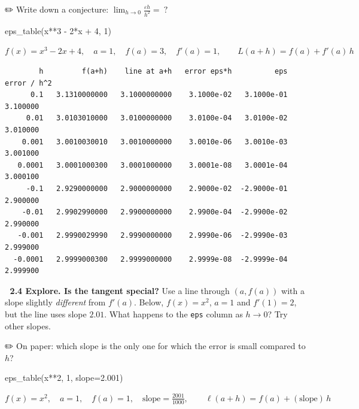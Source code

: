 \documentclass[
  letterpaper,
  DIV=11,
  numbers=noendperiod]{scrreprt}
\newenvironment{Shaded}{\begin{snugshade}}{\end{snugshade}}
\newcommand{\DecValTok}[1]{\textcolor[rgb]{0.68,0.00,0.00}{#1}}
\newcommand{\FloatTok}[1]{\textcolor[rgb]{0.68,0.00,0.00}{#1}}
\newcommand{\NormalTok}[1]{\textcolor[rgb]{0.00,0.23,0.31}{#1}}
\newcommand{\OperatorTok}[1]{\textcolor[rgb]{0.37,0.37,0.37}{#1}}
\theoremstyle{plain}
\theoremstyle{plain}
\theoremstyle{definition}
\theoremstyle{definition}
\theoremstyle{definition}
\theoremstyle{plain}
\theoremstyle{plain}
\theoremstyle{remark}
\begin{document}
✏️ Write down a conjecture:
\(\displaystyle\lim_{h\to0}\frac{\varepsilon h}{h^2} = \ ?\)

\begin{Shaded}
\begin{Highlighting}[]
\NormalTok{eps\_table(x}\OperatorTok{**}\DecValTok{3} \OperatorTok{{-}} \DecValTok{2}\OperatorTok{*}\NormalTok{x }\OperatorTok{+} \DecValTok{4}\NormalTok{, }\DecValTok{1}\NormalTok{)}
\end{Highlighting}
\end{Shaded}

$\displaystyle f(x) = x^{3} - 2 x + 4,\quad a = 1,\quad f(a) = 3,\quad f'(a) = 1,\qquad L(a+h) = f(a) + f'(a)\,h$

\begin{verbatim}
        h         f(a+h)    line at a+h   error eps*h          eps  error / h^2
      0.1   3.1310000000   3.1000000000    3.1000e-02   3.1000e-01     3.100000
     0.01   3.0103010000   3.0100000000    3.0100e-04   3.0100e-02     3.010000
    0.001   3.0010030010   3.0010000000    3.0010e-06   3.0010e-03     3.001000
   0.0001   3.0001000300   3.0001000000    3.0001e-08   3.0001e-04     3.000100
     -0.1   2.9290000000   2.9000000000    2.9000e-02  -2.9000e-01     2.900000
    -0.01   2.9902990000   2.9900000000    2.9900e-04  -2.9900e-02     2.990000
   -0.001   2.9990029990   2.9990000000    2.9990e-06  -2.9990e-03     2.999000
  -0.0001   2.9999000300   2.9999000000    2.9999e-08  -2.9999e-04     2.999900
\end{verbatim}

🔬 \textbf{2.4 Explore. Is the tangent special?} Use a line through
\((a, f(a))\) with a slope slightly \emph{different} from \(f'(a)\).
Below, \(f(x) = x^2\), \(a=1\) and \(f'(1) = 2\), but the line uses
slope \(2.01\). What happens to the \texttt{eps} column as \(h\to0\)?
Try other slopes.

✏️ On paper: which slope is the only one for which the error is small
compared to \(h\)?

\begin{Shaded}
\begin{Highlighting}[]
\NormalTok{eps\_table(x}\OperatorTok{**}\DecValTok{2}\NormalTok{, }\DecValTok{1}\NormalTok{, slope}\OperatorTok{=}\FloatTok{2.001}\NormalTok{)}
\end{Highlighting}
\end{Shaded}

$\displaystyle f(x) = x^{2},\quad a = 1,\quad f(a) = 1,\quad \text{slope} = \frac{2001}{1000},\qquad \ell(a+h) = f(a) + (\text{slope})\,h$
\end{document}
